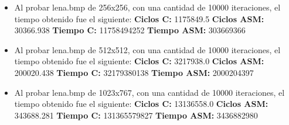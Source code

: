 \documentclass[10pt, a4paper]{article}
\begin{document}
\begin{itemize}
\begin{itemize}
\item{Al probar lena.bmp de 256x256, con una cantidad de 10000 iteraciones, el tiempo obtenido fue el siguiente:\newline
\newline
\textbf{Ciclos C:}                 1175849.5\newline
\vspace{0.15cm}
\textbf{Ciclos ASM:}               30366.938\newline
\textbf{Tiempo C:}                 11758494252\newline
\textbf{Tiempo ASM:}               303669366\newline}

\item{Al probar lena.bmp de 512x512, con una cantidad de 10000 iteraciones, el tiempo obtenido fue el siguiente:\newline
\newline
\textbf{Ciclos C:}                  3217938.0\newline
\vspace{0.15cm}
\textbf{Ciclos ASM:}               200020.438\newline
\textbf{Tiempo C:}                 32179380138\newline
\textbf{Tiempo ASM:}               2000204397\newline}

\item{Al probar lena.bmp de 1023x767, con una cantidad de 10000 iteraciones, el tiempo obtenido fue el siguiente:\newline
\newline
\textbf{Ciclos C:}                 13136558.0\newline
\vspace{0.15cm}
\textbf{Ciclos ASM:}               343688.281\newline
\textbf{Tiempo C:}                 131365579827\newline
\textbf{Tiempo ASM:}               3436882980\newline}

\end{itemize}


\end{itemize}
\end{document}
